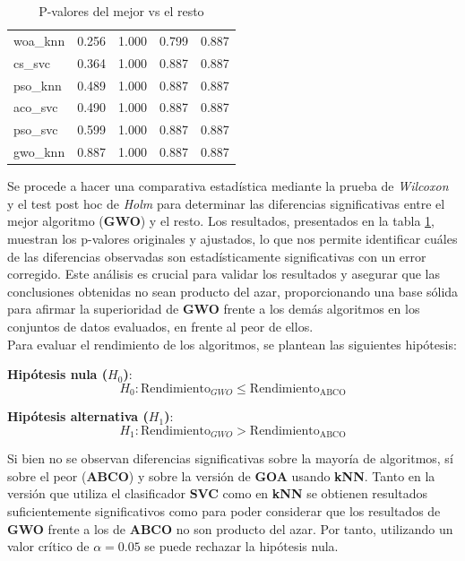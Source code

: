 \begin{table}[htb]
\begin{tabular}{lllll}
        woa\_knn   & 0.256     & 1.000          & 0.799          & 0.887          \\
        cs\_svc    & 0.364     & 1.000          & 0.887          & 0.887          \\
        pso\_knn   & 0.489     & 1.000          & 0.887          & 0.887          \\
        aco\_svc   & 0.490     & 1.000          & 0.887          & 0.887          \\
        pso\_svc   & 0.599     & 1.000          & 0.887          & 0.887          \\
        gwo\_knn   & 0.887     & 1.000          & 0.887          & 0.887          \\
        \bottomrule
    \end{tabular}
    \caption{P-valores del mejor vs el resto}
    \label{tab:p-valus_gwo_vs_rest}
\end{table}

Se procede a hacer una comparativa estadística mediante la prueba de \textit{Wilcoxon} y el test post hoc de \textit{Holm} para determinar las diferencias significativas entre el mejor algoritmo (\textbf{GWO}) y el resto. Los resultados, presentados en la tabla \ref{tab:p-valus_gwo_vs_rest}, muestran los p-valores originales y ajustados, lo que nos permite identificar cuáles de las diferencias observadas son estadísticamente significativas con un error corregido. Este análisis es crucial para validar los resultados y asegurar que las conclusiones obtenidas no sean producto del azar, proporcionando una base sólida para afirmar la superioridad de \textbf{GWO} frente a los demás algoritmos en los conjuntos de datos evaluados, en frente al peor de ellos.\\[6pt]

Para evaluar el rendimiento de los algoritmos, se plantean las siguientes hipótesis:

\textbf{Hipótesis nula (\(H_0\))}:
\begin{equation}
    H_0: \text{Rendimiento}_{GWO} \leq \text{Rendimiento}_{\text{ABCO}}
\end{equation}

\textbf{Hipótesis alternativa (\(H_1\))}:
\begin{equation}
    H_1: \text{Rendimiento}_{GWO} > \text{Rendimiento}_{\text{ABCO}}
\end{equation}

Si bien no se observan diferencias significativas sobre la mayoría de algoritmos, sí sobre el peor (\textbf{ABCO}) y sobre la versión de \textbf{GOA} usando \textbf{kNN}. Tanto en la versión que utiliza el clasificador \textbf{SVC} como en \textbf{kNN} se obtienen resultados suficientemente significativos como para poder considerar que los resultados de \textbf{GWO} frente a los de \textbf{ABCO} no son producto del azar. Por tanto, utilizando un valor crítico de $\alpha=0.05$ se puede rechazar la hipótesis nula.


